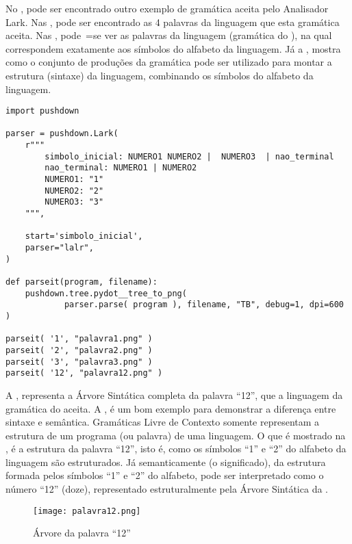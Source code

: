 No ,
pode ser encontrado outro exemplo de gramática aceita pelo Analisador Lark.
Nas ,
pode ser encontrado as 4 palavras da linguagem que esta gramática aceita.
Nas ,
pode~=se ver as palavras da linguagem (gramática do ),
na qual correspondem exatamente aos símbolos do alfabeto da linguagem.
Já a ,
mostra como o conjunto de produções da gramática pode ser utilizado para montar a estrutura (sintaxe) da linguagem,
combinando os símbolos do alfabeto da linguagem.
\begin{code}
\caption{Exemplo de gramática com uma Estrutura de Sintaxe}
\label{code:ExemploDeEstruturaDeGramaticaLark}
\begin{verbatim}
import pushdown

parser = pushdown.Lark(
    r"""
        simbolo_inicial: NUMERO1 NUMERO2 |  NUMERO3  | nao_terminal
        nao_terminal: NUMERO1 | NUMERO2
        NUMERO1: "1"
        NUMERO2: "2"
        NUMERO3: "3"
    """,

    start='simbolo_inicial',
    parser="lalr",
)

def parseit(program, filename):
    pushdown.tree.pydot__tree_to_png(
            parser.parse( program ), filename, "TB", debug=1, dpi=600 )

parseit( '1', "palavra1.png" )
parseit( '2', "palavra2.png" )
parseit( '3', "palavra3.png" )
parseit( '12', "palavra12.png" )
\end{verbatim}
\end{code}

A ,
representa a Árvore Sintática completa da palavra ``12'',
que a linguagem da gramática do  aceita.
A ,
é um bom exemplo para demonstrar a diferença entre sintaxe e
semântica.
Gramáticas Livre de Contexto somente representam a estrutura de um programa (ou palavra) de uma linguagem.
O que é mostrado na ,
é a estrutura da palavra ``12'',
isto é,
como os símbolos ``1'' e
``2'' do alfabeto da linguagem são estruturados.
Já semanticamente (o significado),
da estrutura formada pelos símbolos ``1'' e
``2'' do alfabeto,
pode ser interpretado como o número ``12'' (doze),
representado estruturalmente pela Árvore Sintática da .
\begin{figure}[H]
\caption{Árvore da palavra ``12''}
\label{Figure:palavra12}
\centering
\texttt{[image: palavra12.png]}
\end{figure}

